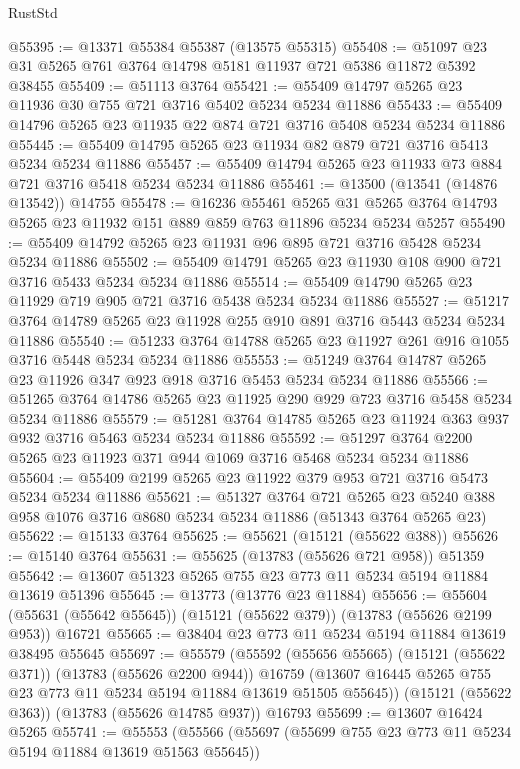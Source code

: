 \begin{lexlean}{RustStd}
\begin{coremodule}
@55395 := @13371 @55384 @55387 (@13575 @55315)
@55408 := @51097 @23 @31 @5265 @761 @3764 @14798 @5181 @11937 @721 @5386 @11872 @5392 @38455
@55409 := @51113 @3764
@55421 := @55409 @14797 @5265 @23 @11936 @30 @755 @721 @3716 @5402 @5234 @5234 @11886
@55433 := @55409 @14796 @5265 @23 @11935 @22 @874 @721 @3716 @5408 @5234 @5234 @11886
@55445 := @55409 @14795 @5265 @23 @11934 @82 @879 @721 @3716 @5413 @5234 @5234 @11886
@55457 := @55409 @14794 @5265 @23 @11933 @73 @884 @721 @3716 @5418 @5234 @5234 @11886
@55461 := @13500 (@13541 (@14876 @13542)) @14755
@55478 := @16236
    @55461
    @5265
    @31
    @5265
    @3764
    @14793
    @5265
    @23
    @11932
    @151
    @889
    @859
    @763
    @11896
    @5234
    @5234
    @5257
@55490 := @55409 @14792 @5265 @23 @11931 @96 @895 @721 @3716 @5428 @5234 @5234 @11886
@55502 := @55409 @14791 @5265 @23 @11930 @108 @900 @721 @3716 @5433 @5234 @5234 @11886
@55514 := @55409 @14790 @5265 @23 @11929 @719 @905 @721 @3716 @5438 @5234 @5234 @11886
@55527 := @51217 @3764 @14789 @5265 @23 @11928 @255 @910 @891 @3716 @5443 @5234 @5234 @11886
@55540 := @51233 @3764 @14788 @5265 @23 @11927 @261 @916 @1055 @3716 @5448 @5234 @5234 @11886
@55553 := @51249 @3764 @14787 @5265 @23 @11926 @347 @923 @918 @3716 @5453 @5234 @5234 @11886
@55566 := @51265 @3764 @14786 @5265 @23 @11925 @290 @929 @723 @3716 @5458 @5234 @5234 @11886
@55579 := @51281 @3764 @14785 @5265 @23 @11924 @363 @937 @932 @3716 @5463 @5234 @5234 @11886
@55592 := @51297 @3764 @2200 @5265 @23 @11923 @371 @944 @1069 @3716 @5468 @5234 @5234 @11886
@55604 := @55409 @2199 @5265 @23 @11922 @379 @953 @721 @3716 @5473 @5234 @5234 @11886
@55621 := @51327
    @3764
    @721
    @5265
    @23
    @5240
    @388
    @958
    @1076
    @3716
    @8680
    @5234
    @5234
    @11886
    (@51343 @3764 @5265 @23)
@55622 := @15133 @3764
@55625 := @55621 (@15121 (@55622 @388))
@55626 := @15140 @3764
@55631 := @55625 (@13783 (@55626 @721 @958)) @51359
@55642 := @13607 @51323 @5265 @755 @23 @773 @11 @5234 @5194 @11884 @13619 @51396
@55645 := @13773 (@13776 @23 @11884)
@55656 := @55604 (@55631 (@55642 @55645)) (@15121 (@55622 @379)) (@13783 (@55626 @2199 @953)) @16721
@55665 := @38404 @23 @773 @11 @5234 @5194 @11884 @13619 @38495 @55645
@55697 := @55579
    (@55592
      (@55656 @55665)
      (@15121 (@55622 @371))
      (@13783 (@55626 @2200 @944))
      @16759
      (@13607 @16445 @5265 @755 @23 @773 @11 @5234 @5194 @11884 @13619 @51505 @55645))
    (@15121 (@55622 @363))
    (@13783 (@55626 @14785 @937))
    @16793
@55699 := @13607 @16424 @5265
@55741 := @55553
    (@55566
      (@55697 (@55699 @755 @23 @773 @11 @5234 @5194 @11884 @13619 @51563 @55645))

\end{coremodule}
\end{lexlean}
